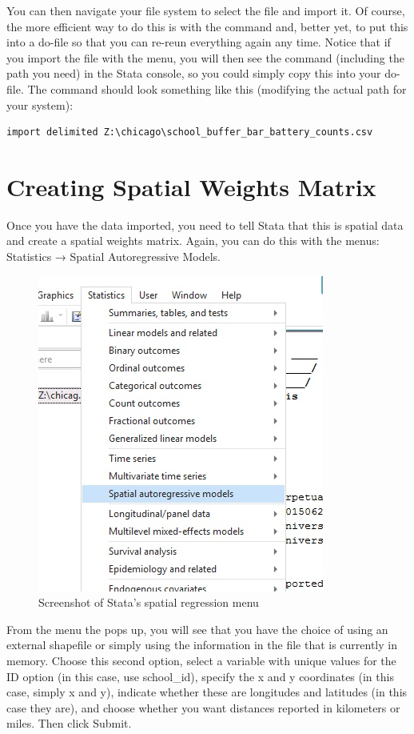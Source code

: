 \documentclass[]{book}
\begin{document}
You can then navigate your file system to select the file and import it. Of course, the more efficient way to do this is with the command and, better yet, to put this into a do-file so that you can re-reun everything again any time. Notice that if you import the file with the menu, you will then see the command (including the path you need) in the Stata console, so you could simply copy this into your do-file. The command should look something like this (modifying the actual path for your system):

\begin{verbatim}
import delimited Z:\chicago\school_buffer_bar_battery_counts.csv
\end{verbatim}

\hypertarget{creating-spatial-weights-matrix}{%
\section{Creating Spatial Weights Matrix}\label{creating-spatial-weights-matrix}}

Once you have the data imported, you need to tell Stata that this is spatial data and create a spatial weights matrix. Again, you can do this with the menus: Statistics → Spatial Autoregressive Models.

\begin{figure}
\centering
\includegraphics{images/stata_spatial_menu.png}
\caption{Screenshot of Stata's spatial regression menu}
\end{figure}

From the menu the pops up, you will see that you have the choice of using an external shapefile or simply using the information in the file that is currently in memory. Choose this second option, select a variable with unique values for the ID option (in this case, use school\_id), specify the x and y coordinates (in this case, simply x and y), indicate whether these are longitudes and latitudes (in this case they are), and choose whether you want distances reported in kilometers or miles. Then click Submit.
\end{document}
